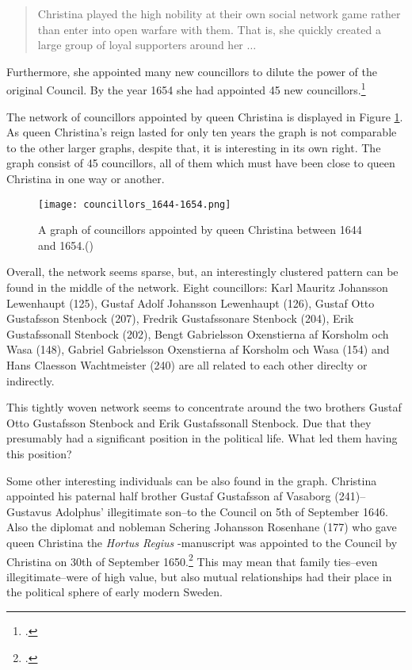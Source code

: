 \begin{quote}
	Christina played the high nobility at their own social network game rather than enter into open warfare with them. That is, she quickly created a large group of loyal supporters around her $\dots$
\end{quote}

Furthermore, she appointed many new councillors to dilute the power of the original Council. By the year 1654 she had appointed 45 new councillors.\footcite[p. 64. ]{HakanenAKoskinen2017}

The network of councillors appointed by queen Christina is displayed in Figure \ref{queenChristinaCouncillors}. As queen Christina's reign lasted for only ten years the graph is not comparable to the other larger graphs, despite that, it is interesting in its own right. The graph consist of 45 councillors, all of them which must have been close to queen Christina in one way or another.

\begin{figure}	
	\texttt{[image: councillors\_1644-1654.png]}
	\caption[Councillors appointed by queen Christina]{A graph of councillors appointed by queen Christina between 1644 and 1654.(\cite{councillorsDS})}
	\label{queenChristinaCouncillors}
	\centering
\end{figure}

Overall, the network seems sparse, but, an interestingly clustered pattern can be found in the middle of the network. Eight councillors: Karl Mauritz Johansson Lewenhaupt (125), Gustaf Adolf Johansson Lewenhaupt (126), Gustaf Otto Gustafsson Stenbock (207), Fredrik Gustafssonare Stenbock (204), Erik Gustafssonall Stenbock (202), Bengt Gabrielsson Oxenstierna af Korsholm och Wasa (148), Gabriel Gabrielsson Oxenstierna af Korsholm och Wasa (154) and Hans Claesson Wachtmeister (240) are all related to each other direclty or indirectly. 

This tightly woven network seems to concentrate around the two brothers Gustaf Otto Gustafsson Stenbock and Erik Gustafssonall Stenbock. Due that they presumably had a significant position in the political life. What led them having this position?

Some other interesting individuals can be also found in the graph. Christina appointed his paternal half brother Gustaf Gustafsson af Vasaborg (241)–Gustavus Adolphus' illegitimate son–to the Council on 5th of September 1646. Also the diplomat and nobleman Schering Johansson Rosenhane (177) who gave queen Christina the \textit{Hortus Regius} -manuscript was appointed to the Council by Christina on 30th of September 1650.\footcite{councillorsDS} This may mean that family ties–even illegitimate–were of high value, but also mutual relationships had their place in the political sphere of early modern Sweden.

